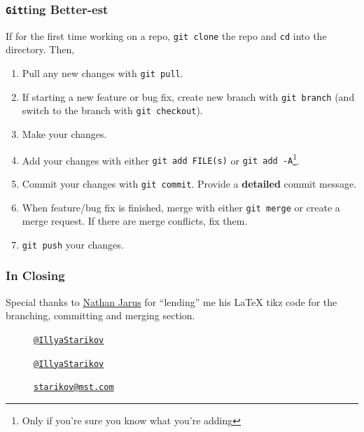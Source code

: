 \documentclass{beamer}
\newcounter{branching}
\newcounter{committing}
\newcounter{merging}
\newcounter{conflicts}
\newcommand{\shellcmd}[1]{\texttt{\colorbox{gray!30}{#1}}}
\begin{document}
\begin{frame}
    \frametitle{\shellcmd{Git}ting Better-est}

    If for the first time working on a repo, \shellcmd{git clone} the repo and \shellcmd{cd} into the directory. Then,

    \begin{enumerate}
        \item Pull any new changes with \shellcmd{git pull}.
        \item If starting a new feature or bug fix, create new branch with \shellcmd{git branch} (and switch to the branch with \shellcmd{git checkout}).
        \item Make your changes.
        \item Add your changes with either \shellcmd{git add FILE(s)} or \shellcmd{git add -A}\footnote{Only if you're sure you know what you're adding}.
        \item Commit your changes with \shellcmd{git commit}. Provide a \textbf{detailed} commit message.
        \item When feature/bug fix is finished, merge with either \shellcmd{git merge} or create a merge request. If there are merge conflicts, fix them.
        \item \shellcmd{git push} your changes.
    \end{enumerate}

\end{frame}


\begin{frame}
    \frametitle{In Closing}
    Special thanks to \href{http://web.mst.edu/~nmjxv3/}{Nathan Jarus} for ``lending'' me his \LaTeX{} tikz code for the branching, committing and merging section.

    \begin{description}
    \item [\faTwitter] \href{https://twitter.com/IllyaStarikov}{\nolinkurl{@IllyaStarikov}}
    \item [\faGithub]  \href{https://github.com/IllyaStarikov}{\nolinkurl{@IllyaStarikov}}
    \item [\faComment] \href{mailto:starikov@mst.edu}{\nolinkurl{starikov@mst.com}}
    \end{description}
\end{frame}
\end{document}
